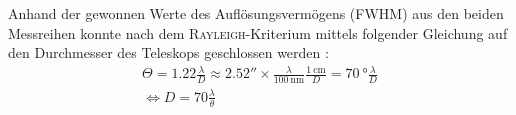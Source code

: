     Anhand der gewonnen Werte des Auflösungsvermögens (FWHM) aus den beiden Messreihen konnte nach dem \textsc{Rayleigh}-Kriterium mittels folgender Gleichung auf den Durchmesser des Teleskops geschlossen werden \cite{Karttunen2013}:
    \begin{align}
        \Theta = 1.22 \frac{\lambda}{D} \approx \ang{;;2.52} \times \frac{\lambda}{\SI{100}{\nano \metre}} \frac{\SI{1}{\centi \metre}}{D} = \SI{70}{\degree} \frac{\lambda}{D}\\
        \Leftrightarrow D = 70 \frac{\lambda}{\theta}
    \end{align}
